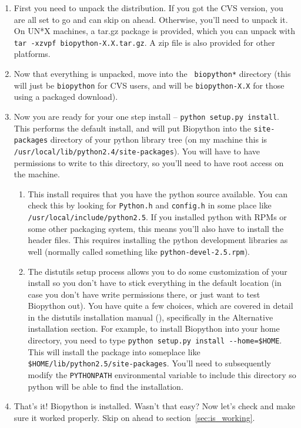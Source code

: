 \documentclass{article}
\begin{document}
\begin{enumerate}

\item First you need to unpack the distribution. If you got the CVS version, you are all set to go and can skip on ahead. Otherwise, you'll need to unpack it. On UN*X machines, a tar.gz package is provided, which you can unpack with \verb|tar -xzvpf biopython-X.X.tar.gz|. A zip file is also provided for other platforms.

\item Now that everything is unpacked, move into the \verb| biopython*| directory (this will just be \verb|biopython| for CVS users, and will be \verb|biopython-X.X| for those using a packaged download). 

\item Now you are ready for your one step install -- \verb|python setup.py install|. This performs the default install, and will put Biopython into the \verb|site-packages| directory of your python library tree (on my machine this is \verb|/usr/local/lib/python2.4/site-packages|). You will have to have permissions to write to this directory, so you'll need to have root access on the machine.

\begin{enumerate}

\item This install requires that you have the python source available. You can check this by looking for \verb|Python.h| and \verb|config.h| in some place like \verb|/usr/local/include/python2.5|. If you installed python with RPMs or 
some other packaging system, this means you'll also have to install the
header files. This requires installing the python development libraries
as well (normally called something like \verb|python-devel-2.5.rpm|).

\item The distutils setup process allows you to do some customization of your install so you don't have to stick everything in the default location (in case you don't have write permissions there, or just want to test Biopython out). You have quite a few choices, which are covered in detail in the distutils installation manual (), specifically in the Alternative installation section. For example, to install Biopython into your home directory, you need to type \verb|python setup.py install --home=$HOME|. This will install the package into someplace like \verb|$HOME/lib/python2.5/site-packages|. You'll need to subsequently modify the \verb|PYTHONPATH| environmental variable to include this directory so python will be able to find the installation.

\end{enumerate}

\item That's it! Biopython is installed. Wasn't that easy? Now let's check and make sure it worked properly. Skip on ahead to section~\ref{sec:is_working}.

\end{enumerate}
\end{document}
